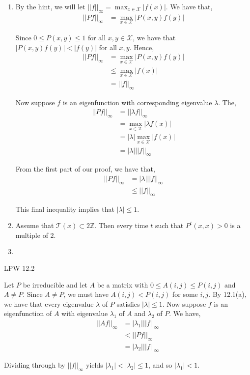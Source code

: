 \documentclass[12pt]{article}
\newenvironment{problem}[2][Problem]{\begin{trivlist}
\item[\hskip \labelsep {\bfseries #1}\hskip \labelsep {\bfseries #2.}]}{\end{trivlist}}
\begin{document}
\begin{enumerate}[\alph*)]

\item By the hint, we will let $||f||_{\infty} = \max_{x \in \mathcal{X}} |f(x)|$. We have that,
\begin{align*}
||Pf||_{\infty} &= \max_{x \in \mathcal{X}} |P(x,y) f(y)|
\end{align*}

Since $0 \leq P(x,y) \leq 1$ for all $x,y \in \mathcal{X}$, we have that $|P(x,y) f(y)| < |f(y)|$ for all $x,y$. Hence,
\begin{align*}
||Pf||_{\infty} &= \max_{x \in \mathcal{X}} |P(x,y) f(y)|\\
&\leq \max_{x \in \mathcal{X}} |f(x)|\\
&= ||f||_{\infty}
\end{align*}

Now suppose $f$ is an eigenfunction with corresponding eigenvalue $\lambda$. The,
\begin{align*}
||Pf||_{\infty} &= ||\lambda f||_{\infty}\\
&= \max_{x \in \mathcal{X}} | \lambda f(x)|\\
&= |\lambda| \max_{x \in \mathcal{X}}  |f(x)|\\
&= |\lambda| ||f||_{\infty}
\end{align*}

From the first part of our proof, we have that,
\begin{align*}
||Pf||_{\infty} &= |\lambda| ||f||_{\infty}\\
&\leq ||f||_{\infty}
\end{align*}

This final inequality implies that $|\lambda| \leq 1$.

\item Assume that $\mathcal{T}(x) \subset 2 \mathbb{Z}$. Then every time $t$ such that $P^t(x, x) > 0$ is a multiple of $2$.

\item

\end{enumerate}

\begin{problem}{III}
LPW 12.2
\end{problem}

Let $P$ be irreducible and let $A$ be a matrix with $0 \leq A(i, j) \leq P(i, j)$ and $A \neq P$. Since $A \neq P$, we must have $A(i, j) < P(i,j)$ for some $i,j$. By 12.1(a), we have that every eigenvalue $\lambda$ of $P$ satisfies $|\lambda| \leq 1$. Now suppose $f$ is an eigenfunction of $A$ with eigenvalue $\lambda_1$ of $A$ and $\lambda_2$ of $P$. We have,
\begin{align*}
||Af||_{\infty} &= |\lambda_1| ||f||_{\infty}\\
&< ||Pf||_{\infty}\\
&= |\lambda_2| ||f||_{\infty}
\end{align*}

Dividing through by $||f||_{\infty}$ yields $|\lambda_1| < |\lambda_2| \leq 1$, and so $|\lambda_1| < 1$.
\end{document}
